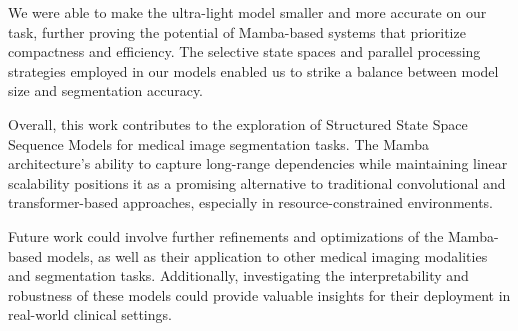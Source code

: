\documentclass[conference]{IEEEtran}
\begin{document}
We were able to make the ultra-light model smaller and more accurate on our task, further proving the potential of Mamba-based systems that prioritize compactness and efficiency. The selective state spaces and parallel processing strategies employed in our models enabled us to strike a balance between model size and segmentation accuracy.

Overall, this work contributes to the exploration of Structured State Space Sequence Models for medical image segmentation tasks. The Mamba architecture's ability to capture long-range dependencies while maintaining linear scalability positions it as a promising alternative to traditional convolutional and transformer-based approaches, especially in resource-constrained environments.

Future work could involve further refinements and optimizations of the Mamba-based models, as well as their application to other medical imaging modalities and segmentation tasks. Additionally, investigating the interpretability and robustness of these models could provide valuable insights for their deployment in real-world clinical settings.
\end{document}
